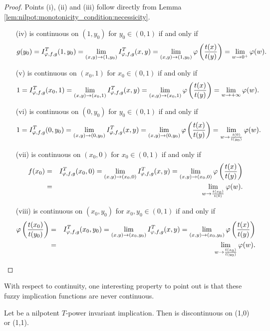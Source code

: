\begin{proof} Points (i), (ii) and (iii) follow directly from Lemma \ref{lem:nilpot:monotonicity_condition:necessicity}.
	\begin{enumerate}
		\item[(iv)]  \IT is continuous on $(1,y_0)$ for $y_0 \in (0,1)$  if and only if
		$$g(y_0)=I^T_{\varphi,f,g}(1,y_0)=\lim_{(x,y) \to (1,y_0)} I^T_{\varphi,f,g}(x,y) = \lim_{(x,y) \to (1,y_0)} \varphi \left(\frac{t(x)}{t(y)}\right) = \lim_{w \to 0^+} \varphi(w).$$
		\item[(v)] \IT is continuous on $(x_0,1)$ for $x_0 \in (0,1)$ if and only if
		$$1=I^T_{\varphi,f,g}(x_0,1)=\lim_{(x,y) \to (x_0,1)} I^T_{\varphi,f,g}(x,y) = \lim_{(x,y) \to (x_0,1)} \varphi \left(\frac{t(x)}{t(y)} \right) = \lim_{w \to + \infty} \varphi(w).$$
		\item[(vi)] \IT is continuous on $(0,y_0)$ for $y_0 \in (0,1)$ if and only if 
		$$1 = I^T_{\varphi,f,g}(0,y_0)= \lim_{(x,y) \to (0,y_0)} I^T_{\varphi,f,g}(x,y) = \lim_{(x,y) \to (0,y_0)} \varphi \left(\frac{t(x)}{t(y)}\right) = \lim_{w \to \frac{t(0)}{t(y_0)}} \varphi(w).$$
		\item[(vii)] \IT is continuous on $(x_0,0)$ for $x_0 \in (0,1)$ if and only if 
		\begin{eqnarray*}
		f(x_0) &=& I^T_{\varphi,f,g}(x_0,0)= \lim_{(x,y) \to (x_0,0)} I^T_{\varphi,f,g}(x,y) = \lim_{(x,y) \to (x_0,0)} \varphi \left(\frac{t(x)}{t(y)}\right) \\
		&=& \lim_{w \to \frac{t(x_0)}{t(0)}} \varphi(w).
		\end{eqnarray*}
		\item[(viii)] \IT is continuous on $(x_0,y_0)$ for $x_0,y_0 \in (0,1)$ if and only if 
		\begin{eqnarray*}
		\varphi \left(\frac{t(x_0)}{t(y_0)}\right) &=& I^T_{\varphi,f,g}(x_0,y_0) = \lim_{(x,y) \to (x_0,y_0)} I^T_{\varphi,f,g}(x,y) = \lim_{(x,y) \to (x_0,y_0)} \varphi \left(\frac{t(x)}{t(y)}\right) \\
		&=& \lim_{w \to \frac{t(x_0)}{t(y_0)}} \varphi(w).
		\end{eqnarray*}
	\end{enumerate}
\end{proof}

With respect to continuity, one interesting property to point out is that these fuzzy implication functions are never continuous.

\begin{corollary}\label{cor:nilpotent:discontinuous}
	Let \IT be a nilpotent $T$-power invariant implication. Then \IT is discontinuous on (1,0) or (1,1).
\end{corollary}

